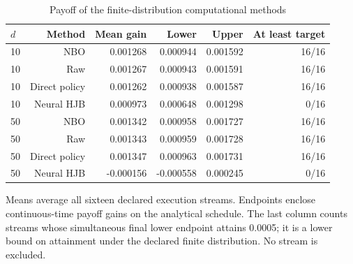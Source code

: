 \begin{table}[!htbp]
\centering\small
\caption{Payoff of the finite-distribution computational methods}
\label{tab:r15methodmeans}
\begin{tabular}{lrrrrr}
\toprule
$d$ & Method & Mean gain & Lower & Upper & At least target \\
\midrule
10 & NBO & 0.001268 & 0.000944 & 0.001592 & 16/16 \\
10 & Raw & 0.001267 & 0.000943 & 0.001591 & 16/16 \\
10 & Direct policy & 0.001262 & 0.000938 & 0.001587 & 16/16 \\
10 & Neural HJB & 0.000973 & 0.000648 & 0.001298 & 0/16 \\
50 & NBO & 0.001342 & 0.000958 & 0.001727 & 16/16 \\
50 & Raw & 0.001343 & 0.000959 & 0.001728 & 16/16 \\
50 & Direct policy & 0.001347 & 0.000963 & 0.001731 & 16/16 \\
50 & Neural HJB & -0.000156 & -0.000558 & 0.000245 & 0/16 \\
\bottomrule
\end{tabular}
\par\medskip\noindent\footnotesize Means average all sixteen declared execution streams. Endpoints enclose continuous-time payoff gains on the analytical schedule. The last column counts streams whose simultaneous final lower endpoint attains 0.0005; it is a lower bound on attainment under the declared finite distribution. No stream is excluded.
\end{table}
